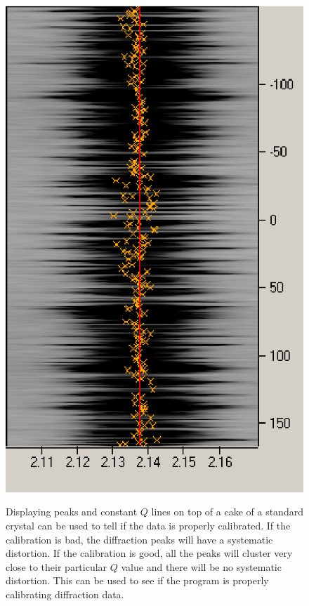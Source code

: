 \begin{figure}[htb]
{    \includegraphics[scale=.75]{figures/good_calibration_cake_zoom_peaks.eps}}		
    \caption{Displaying peaks and constant $Q$ lines on top of a 
    cake of a standard crystal can be used to tell if the data is properly 
    calibrated. If the calibration is bad, the diffraction peaks will have 
    a systematic distortion. If the calibration is good, all the peaks will 
    cluster very close to their particular $Q$ value and there will be no 
    systematic distortion. This can be used to see if the program is properly 
    calibrating diffraction data.}
    \label{calibration_cake}
\end{figure}

